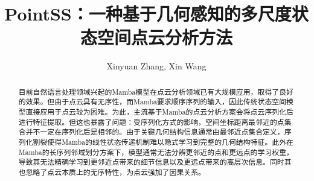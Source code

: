 \documentclass[preprint,12pt]{elsarticle}
\begin{document}
\begin{frontmatter}



\title{PointSS：一种基于几何感知的多尺度状态空间点云分析方法}


\author{Xinyuan Zhang, Xin Wang} %


\begin{abstract}

目前自然语言处理领域兴起的Mamba模型在点云分析领域已有大规模应用，取得了良好的效果。但由于点云具有无序性，而Mamba要求顺序序列的输入，因此传统状态空间模型直接应用于点云较为困难。为此，主流基于Mamba的点云分析方案会将点云序列化后进行特征提取。但这也暴露了问题：受序列化方式的影响，空间坐标距离最邻近的点集合并不一定在序列化后是相邻的。由于关键几何结构信息通常由最邻近点集合定义，序列化割裂使得Mamba的线性状态传递机制难以隐式学习到完整的几何结构特征。此外在Mamba的长序列邻域划分方案下，模型通常无法分辨更邻近的点和更远点的学习权重，导致其无法精确学习到更邻近点带来的细节信息以及更远点带来的高层次信息。同时其也忽略了点云本质上的无序特性，为点云强加了因果关系。


\end{abstract}
\end{frontmatter}
\end{document}
